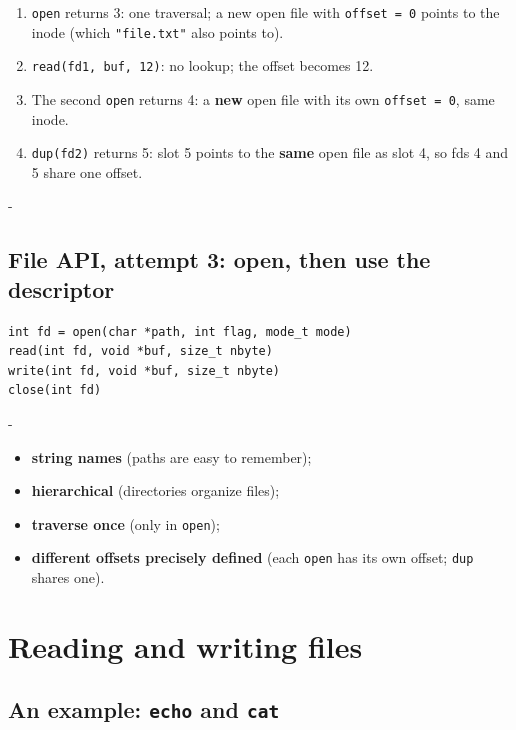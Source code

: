 \documentclass[11pt,a4paper]{article}
\makeatletter
\newcommand{\keepspace}[1]{\par\penalty-100\begingroup
  \setlength{\dimen@}{#1}\dimen@ii\pagegoal\advance\dimen@ii-\pagetotal
  \ifdim\dimen@>\dimen@ii\ifdim\dimen@ii>\z@\vfil\fi\break\fi\endgroup}
\makeatother
\begin{document}
\begin{enumerate}
  \item \texttt{open} returns 3: one traversal; a new open file with
        \texttt{offset = 0} points to the inode (which \texttt{"file.txt"}
        also points to).
  \item \texttt{read(fd1, buf, 12)}: no lookup; the offset becomes 12.
  \item The second \texttt{open} returns 4: a \textbf{new} open file with its
        own \texttt{offset = 0}, same inode.
  \item \texttt{dup(fd2)} returns 5: slot 5 points to the \textbf{same} open
        file as slot 4, so fds 4 and 5 share one offset.
\end{enumerate}

\keepspace{7\baselineskip}
\subsection{File API, attempt 3: open, then use the descriptor}

\begin{lstlisting}[numbers=none]
int fd = open(char *path, int flag, mode_t mode)
read(int fd, void *buf, size_t nbyte)
write(int fd, void *buf, size_t nbyte)
close(int fd)
\end{lstlisting}

\keepspace{7\baselineskip}
\begin{keybox}[Advantages]
\begin{itemize}
  \item \textbf{string names} (paths are easy to remember);
  \item \textbf{hierarchical} (directories organize files);
  \item \textbf{traverse once} (only in \texttt{open});
  \item \textbf{different offsets precisely defined} (each \texttt{open} has
        its own offset; \texttt{dup} shares one).
\end{itemize}
\end{keybox}

\section{Reading and writing files}

\subsection{An example: \texttt{echo} and \texttt{cat}}
\end{document}
